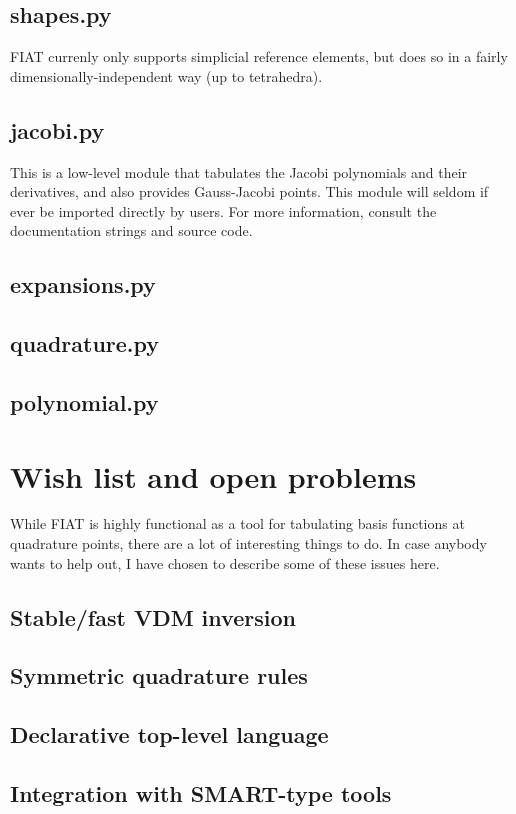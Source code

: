\documentclass{fenicsmanual}
\begin{document}
\section{shapes.py}
FIAT currenly only supports simplicial reference elements, but does so
in a fairly dimensionally-independent way (up to tetrahedra).

\section{jacobi.py}
This is a low-level module that tabulates the Jacobi polynomials and
their derivatives, and also provides Gauss-Jacobi points.  This module
will seldom if ever be imported directly by users.  For more
information, consult the documentation strings and source code.

\section{expansions.py}


\section{quadrature.py}


\section{polynomial.py}



\chapter{Wish list and open problems}
While FIAT is highly functional as a tool for tabulating basis
functions at quadrature points, there are a lot of interesting
things to do.  In case anybody wants to help out, I have
chosen to describe some of these issues here.

\section{Stable/fast VDM inversion}

\section{Symmetric quadrature rules}

\section{Declarative top-level language}

\section{Integration with SMART-type tools}
\end{document}
